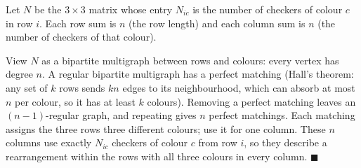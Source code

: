 Let $N$ be the $3\times3$ matrix whose entry $N_{ic}$ is the number of checkers of colour $c$ in row $i$. Each row sum is $n$ (the row length) and each column sum is $n$ (the number of checkers of that colour).

View $N$ as a bipartite multigraph between rows and colours: every vertex has degree $n$. A regular bipartite multigraph has a perfect matching (Hall's theorem: any set of $k$ rows sends $kn$ edges to its neighbourhood, which can absorb at most $n$ per colour, so it has at least $k$ colours). Removing a perfect matching leaves an $(n-1)$-regular graph, and repeating gives $n$ perfect matchings. Each matching assigns the three rows three different colours; use it for one column. These $n$ columns use exactly $N_{ic}$ checkers of colour $c$ from row $i$, so they describe a rearrangement within the rows with all three colours in every column. $\blacksquare$
